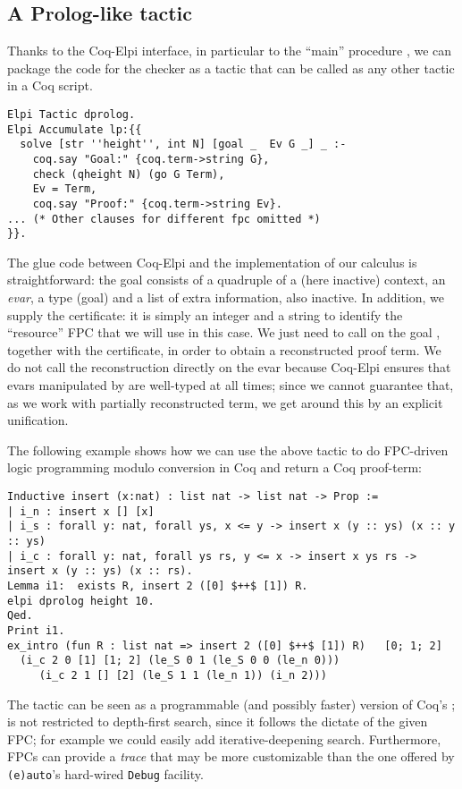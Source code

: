 \subsection{A Prolog-like tactic}

Thanks to the Coq-Elpi interface, in particular to the ``main''
procedure , we can package the \lP code for the checker
as a tactic that can be called as any other tactic in a Coq script.

\begin{lstlisting}[deletekeywords={goal}]
Elpi Tactic dprolog.
Elpi Accumulate lp:{{
  solve [str ''height'', int N] [goal _  Ev G _] _ :-
    coq.say "Goal:" {coq.term->string G},
    check (qheight N) (go G Term),
    Ev = Term,
    coq.say "Proof:" {coq.term->string Ev}.
... (* Other clauses for different fpc omitted *)
}}.
\end{lstlisting}

The glue code between Coq-Elpi and the implementation of our calculus
is straightforward: the goal consists of a quadruple of a (here
inactive) context, an \emph{evar}, a type (goal) and a list of extra
information, also inactive. In addition, we supply the certificate: it
is simply an integer and a string to identify the ``resource'' FPC that we
will use in this case. We just need to call  on the goal  ,
together with the certificate, in order to obtain a reconstructed
proof term. We do not call the reconstruction directly on the evar
because Coq-Elpi ensures that evars manipulated by \lP are well-typed
at all times; since we cannot guarantee that, as we work with
partially reconstructed term, we get around this by an explicit
unification.

The following
example shows how we can use the above tactic to do FPC-driven logic
programming modulo conversion in Coq and return a Coq proof-term:
\begin{lstlisting}[]
Inductive insert (x:nat) : list nat -> list nat -> Prop :=
| i_n : insert x [] [x]
| i_s : forall y: nat, forall ys, x <= y -> insert x (y :: ys) (x :: y :: ys)
| i_c : forall y: nat, forall ys rs, y <= x -> insert x ys rs -> insert x (y :: ys) (x :: rs).
Lemma i1:  exists R, insert 2 ([0] $++$ [1]) R.
elpi dprolog height 10.
Qed.
Print i1.
ex_intro (fun R : list nat => insert 2 ([0] $++$ [1]) R)   [0; 1; 2]
  (i_c 2 0 [1] [1; 2] (le_S 0 1 (le_S 0 0 (le_n 0)))
	 (i_c 2 1 [] [2] (le_S 1 1 (le_n 1)) (i_n 2)))
\end{lstlisting}

The  tactic can be seen as a programmable (and possibly
faster) version of Coq's %
; %
  is not restricted to depth-first search, since
it follows the dictate of the given FPC; for example we could easily add
iterative-deepening search. Furthermore,
 FPCs can provide a
\emph{trace} that may be more customizable than the one offered by 
\texttt{(e)auto}'s hard-wired \texttt{Debug} facility. 

